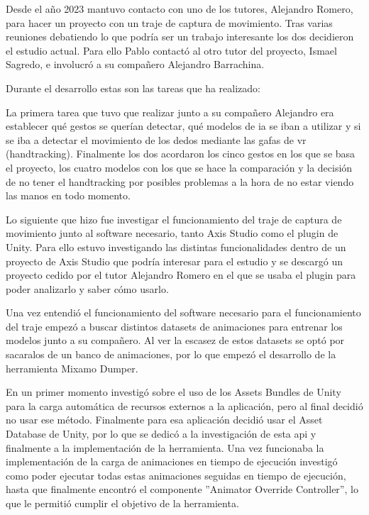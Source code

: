 Desde el año 2023 mantuvo contacto con uno de los tutores, Alejandro Romero, para hacer un proyecto con un traje de captura de movimiento.
Tras varias reuniones debatiendo lo que podría ser un trabajo interesante los dos decidieron el estudio actual.
Para ello Pablo contactó al otro tutor del proyecto, Ismael Sagredo, e involucró a su compañero Alejandro Barrachina.

Durante el desarrollo estas son las tareas que ha realizado:

La primera tarea que tuvo que realizar junto a su compañero Alejandro era establecer qué gestos se querían detectar, qué modelos de \gls{ia} se iban a utilizar y si se iba a detectar el movimiento de los dedos mediante las gafas de \gls{vr} (handtracking).
Finalmente los dos acordaron los cinco gestos en los que se basa el proyecto, los cuatro modelos con los que se hace la comparación y la decisión de no tener el handtracking por posibles problemas a la hora de no estar viendo las manos en todo momento.

Lo siguiente que hizo fue investigar el funcionamiento del traje de captura de movimiento junto al software necesario, tanto Axis Studio como el plugin de Unity.
Para ello estuvo investigando las distintas funcionalidades dentro de un proyecto de Axis Studio que podría interesar para el estudio y se descargó un proyecto cedido por el tutor Alejandro Romero en el que se usaba el plugin para poder analizarlo y saber cómo usarlo.

Una vez entendió el funcionamiento del software necesario para el funcionamiento del traje empezó a buscar distintos datasets de animaciones para entrenar los modelos junto a su compañero.
Al ver la escasez de estos datasets se optó por sacaralos de un banco de animaciones, por lo que empezó el desarrollo de la herramienta Mixamo Dumper.

En un primer momento investigó sobre el uso de los Assets Bundles de Unity para la carga automática de recursos externos a la aplicación, pero al final decidió no usar ese método.
Finalmente para esa aplicación decidió usar el Asset Database de Unity, por lo que se dedicó a la investigación de esta \gls{api} y finalmente a la implementación de la herramienta.
Una vez funcionaba la implementación de la carga de animaciones en tiempo de ejecución investigó como poder ejecutar todas estas animaciones seguidas en tiempo de ejecución, hasta que finalmente encontró el componente ''Animator Override Controller'', lo que le permitió cumplir el objetivo de la herramienta.

